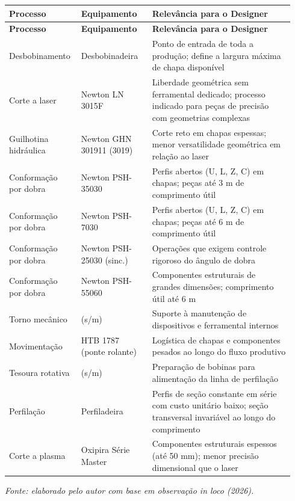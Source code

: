 \documentclass[12pt,a4paper,oneside,brazil,chapter=TITLE]{article}
\newcommand{\quadrofonte}[1]{\par\noindent\textit{Fonte: #1}\vspace{1em}\par}
\begin{document}
{\setlength{\tabcolsep}{4pt}
\begin{longtable}{@{}
  >{\raggedright\arraybackslash}p{0.22\linewidth}
  >{\raggedright\arraybackslash}p{0.24\linewidth}
  >{\raggedright\arraybackslash}p{0.48\linewidth}@{}}
\toprule
\textbf{Processo} & \textbf{Equipamento} & \textbf{Relevância para o Designer} \\
\midrule
\endfirsthead
\toprule
\textbf{Processo} & \textbf{Equipamento} & \textbf{Relevância para o Designer} \\
\midrule
\endhead
\bottomrule
\endlastfoot
Desbobinamento & Desbobinadeira & Ponto de entrada de toda a produção; define a largura máxima de chapa disponível \\
Corte a laser & Newton LN 3015F & Liberdade geométrica sem ferramental dedicado; processo indicado para peças de precisão com geometrias complexas \\
Guilhotina hidráulica & Newton GHN 301911 (3019) & Corte reto em chapas espessas; menor versatilidade geométrica em relação ao laser \\
Conformação por dobra & Newton PSH-35030 & Perfis abertos (U, L, Z, C) em chapas; peças até 3 m de comprimento útil \\
Conformação por dobra & Newton PSH-7030 & Perfis abertos (U, L, Z, C) em chapas; peças até 6 m de comprimento útil \\
Conformação por dobra & Newton PSH-25030 (sinc.) & Operações que exigem controle rigoroso do ângulo de dobra \\
Conformação por dobra & Newton PSH-55060 & Componentes estruturais de grandes dimensões; comprimento útil até 6 m \\
Torno mecânico & (s/m) & Suporte à manutenção de dispositivos e ferramental internos \\
Movimentação & HTB 1787 (ponte rolante) & Logística de chapas e componentes pesados ao longo do fluxo produtivo \\
Tesoura rotativa & (s/m) & Preparação de bobinas para alimentação da linha de perfilação \\
Perfilação & Perfiladeira & Perfis de seção constante em série com custo unitário baixo; seção transversal invariável ao longo do comprimento \\
Corte a plasma & Oxipira Série Master & Componentes estruturais espessos (até 50 mm); menor precisão dimensional que o laser \\
\end{longtable}}

\quadrofonte{elaborado pelo autor com base em observação \textit{in loco} (2026).}
\end{document}

